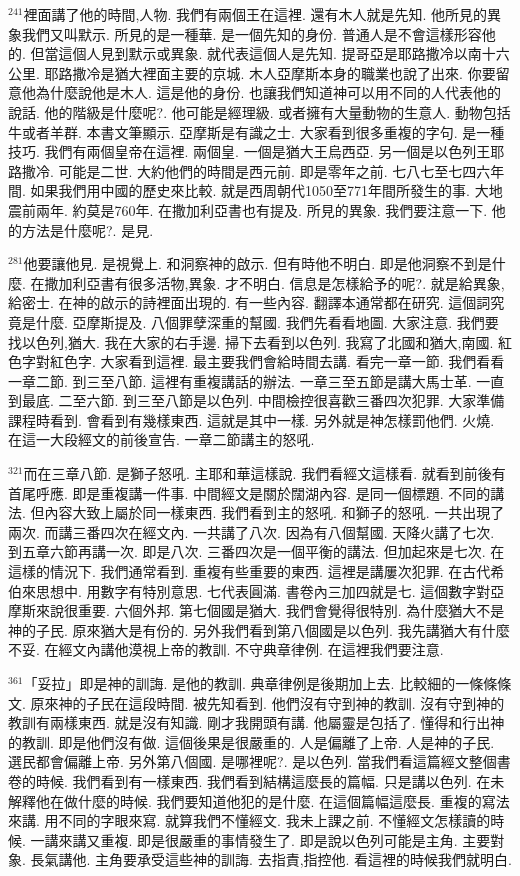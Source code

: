 \documentclass{book}
\begin{document}
$^{241}$裡面講了他的時間,人物.
我們有兩個王在這裡.
還有木人就是先知.
他所見的異象我們又叫默示.
所見的是一種華.
是一個先知的身份.
普通人是不會這樣形容他的.
但當這個人見到默示或異象.
就代表這個人是先知.
提哥亞是耶路撒冷以南十六公里.
耶路撒冷是猶大裡面主要的京城.
木人亞摩斯本身的職業也說了出來.
你要留意他為什麼說他是木人.
這是他的身份.
也讓我們知道神可以用不同的人代表他的說話.
他的階級是什麼呢?.
他可能是經理級.
或者擁有大量動物的生意人.
動物包括牛或者羊群.
本書文筆顯示.
亞摩斯是有識之士.
大家看到很多重複的字句.
是一種技巧.
我們有兩個皇帝在這裡.
兩個皇.
一個是猶大王烏西亞.
另一個是以色列王耶路撒冷.
可能是二世.
大約他們的時間是西元前.
即是零年之前.
七八七至七四六年間.
如果我們用中國的歷史來比較.
就是西周朝代1050至771年間所發生的事.
大地震前兩年.
約莫是760年.
在撒加利亞書也有提及.
所見的異象.
我們要注意一下.
他的方法是什麼呢?.
是見.

$^{281}$他要讓他見.
是視覺上.
和洞察神的啟示.
但有時他不明白.
即是他洞察不到是什麼.
在撒加利亞書有很多活物,異象.
才不明白.
信息是怎樣給予的呢?.
就是給異象,給密士.
在神的啟示的詩裡面出現的.
有一些內容.
翻譯本通常都在研究.
這個詞究竟是什麼.
亞摩斯提及.
八個罪孽深重的幫國.
我們先看看地圖.
大家注意.
我們要找以色列,猶大.
我在大家的右手邊.
掃下去看到以色列.
我寫了北國和猶大,南國.
紅色字對紅色字.
大家看到這裡.
最主要我們會給時間去講.
看完一章一節.
我們看看一章二節.
到三至八節.
這裡有重複講話的辦法.
一章三至五節是講大馬士革.
一直到最底.
二至六節.
到三至八節是以色列.
中間檢控很喜歡三番四次犯罪.
大家準備課程時看到.
會看到有幾樣東西.
這就是其中一樣.
另外就是神怎樣罰他們.
火燒.
在這一大段經文的前後宣告.
一章二節講主的怒吼.

$^{321}$而在三章八節.
是獅子怒吼.
主耶和華這樣說.
我們看經文這樣看.
就看到前後有首尾呼應.
即是重複講一件事.
中間經文是關於闊湖內容.
是同一個標題.
不同的講法.
但內容大致上屬於同一樣東西.
我們看到主的怒吼.
和獅子的怒吼.
一共出現了兩次.
而講三番四次在經文內.
一共講了八次.
因為有八個幫國.
天降火講了七次.
到五章六節再講一次.
即是八次.
三番四次是一個平衡的講法.
但加起來是七次.
在這樣的情況下.
我們通常看到.
重複有些重要的東西.
這裡是講屢次犯罪.
在古代希伯來思想中.
用數字有特別意思.
七代表圓滿.
書卷內三加四就是七.
這個數字對亞摩斯來說很重要.
六個外邦.
第七個國是猶大.
我們會覺得很特別.
為什麼猶大不是神的子民.
原來猶大是有份的.
另外我們看到第八個國是以色列.
我先講猶大有什麼不妥.
在經文內講他漠視上帝的教訓.
不守典章律例.
在這裡我們要注意.

$^{361}$「妥拉」即是神的訓誨.
是他的教訓.
典章律例是後期加上去.
比較細的一條條條文.
原來神的子民在這段時間.
被先知看到.
他們沒有守到神的教訓.
沒有守到神的教訓有兩樣東西.
就是沒有知識.
剛才我開頭有講.
他屬靈是包括了.
懂得和行出神的教訓.
即是他們沒有做.
這個後果是很嚴重的.
人是偏離了上帝.
人是神的子民.
選民都會偏離上帝.
另外第八個國.
是哪裡呢?.
是以色列.
當我們看這篇經文整個書卷的時候.
我們看到有一樣東西.
我們看到結構這麼長的篇幅.
只是講以色列.
在未解釋他在做什麼的時候.
我們要知道他犯的是什麼.
在這個篇幅這麼長.
重複的寫法來講.
用不同的字眼來寫.
就算我們不懂經文.
我未上課之前.
不懂經文怎樣讀的時候.
一講來講又重複.
即是很嚴重的事情發生了.
即是說以色列可能是主角.
主要對象.
長氣講他.
主角要承受這些神的訓誨.
去指責,指控他.
看這裡的時候我們就明白.
\end{document}
